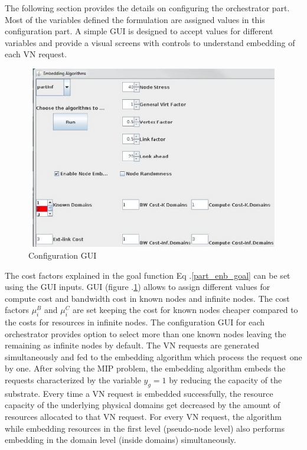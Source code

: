 \documentclass[article,dr=phil,type=msc ,colorback,accentcolor=tud4b]{tudthesis}
\begin{document}
The following section provides the details on configuring the orchestrator part. Most of the variables defined the formulation are assigned values in this configuration part. A simple GUI is designed to accept values for different variables and provide a visual screens with controls to understand embedding of each VN request.
\begin{figure}[h]
	\centering
	\includegraphics[width=13cm, height=8cm]{config.jpg}
	\caption{Configuration GUI}
	\label{config}
\end{figure}

The cost factors explained in the goal function Eq .\ref{part_enb_goal} can be set using the GUI inputs. GUI (figure .\ref{config}) allows to assign different values for compute cost and bandwidth cost in known nodes and infinite nodes. The cost factors $\mu_{i}^{B}$ and  $\mu_{i}^{C}$ are set keeping the cost for known nodes cheaper compared to the costs for resources in infinite nodes. The configuration GUI for each orchestrator provides option to select more than one known nodes leaving the remaining as infinite nodes by default. The VN requests are generated simultaneously and fed to the embedding algorithm which process the request one by one. After solving the MIP problem, the embedding algorithm embeds the requests characterized by the variable $y_{g} = 1$ by reducing the capacity of the substrate. Every time a VN request is embedded successfully, the resource capacity of the underlying physical domains get decreased by the amount of resources allocated to that VN request. For every VN request, the algorithm while embedding resources in the first level (pseudo-node level) also performs embedding in the domain level (inside domains) simultaneously.\newline
\end{document}
